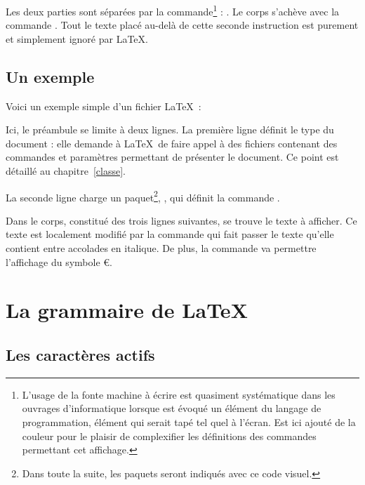Les deux parties sont séparées par la commande\footnote{L'usage de la fonte \og machine à écrire \fg{} est quasiment systématique dans les ouvrages d'informatique lorsque est évoqué un élément du langage de programmation, élément qui serait tapé tel quel à l'écran. Est ici ajouté de la couleur pour le plaisir de complexifier les définitions des commandes permettant cet affichage.} : . Le corps s'achève avec la commande . Tout le texte placé au-delà de cette seconde instruction est purement et simplement ignoré par \LaTeX.


\subsection{Un exemple}

Voici un exemple simple d'un fichier \LaTeX\ : 


Ici, le préambule se limite à deux lignes. La première ligne définit le type du document : elle demande à \LaTeX\ de faire appel à des fichiers contenant des commandes et paramètres permettant de présenter le document. Ce point est détaillé au chapitre~\ref{classe}.

La seconde ligne charge un paquet\footnote{Dans toute la suite, les paquets seront indiqués avec ce code visuel.}, , qui définit la commande .

Dans le corps, constitué des trois lignes suivantes, se trouve le texte à afficher. Ce texte est localement modifié par la commande  qui fait passer le texte qu'elle contient entre accolades en italique. De plus, la commande  va permettre l'affichage du symbole \euro.


\section{La \og grammaire \fg{} de \LaTeX}
\subsection{Les caractères actifs} 

